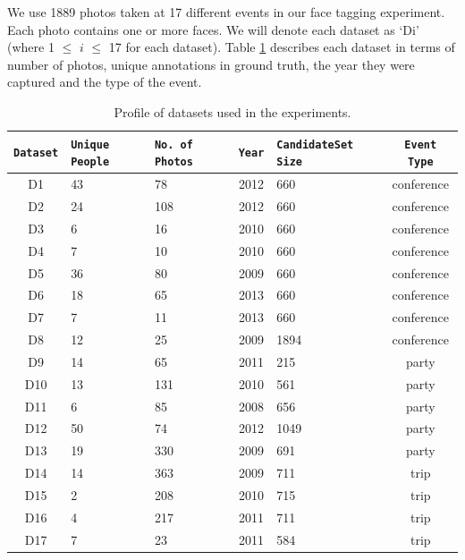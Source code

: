 We use 1889 photos taken at 17 different events in our face tagging experiment. Each photo contains one or more faces. We will denote each dataset as `Di' (where 1 $\leq$ $i$ $\leq$ 17 for each dataset). Table \ref{tbl:unique-persons} describes each dataset in terms of number of photos, unique annotations in ground truth, the year they were captured and the type of the event. 

\begin{table}[h]
\begin{center}
\begin{tabular}{ |c|p{1.5cm}|p{1.5cm}|c|p{2.5cm}|c| }
  \hline
  \texttt{Dataset} & \texttt{Unique People} & \texttt{No.\ of Photos} & \texttt{Year} & \texttt{CandidateSet Size} & \texttt{Event Type}\\
  \hline
     D1  &  43   &   78   &  2012  &  660   & conference \\
     D2  &  24   &   108  &  2012  &  660   & conference \\
     D3  &  6    &   16   &  2010  &  660   & conference \\
     D4  &  7    &   10   &  2010  &  660   & conference \\
     D5  &  36   &   80   &  2009  &  660   & conference \\
     D6  &  18   &   65   &  2013  &  660   & conference \\
     D7  &  7    &   11   &  2013  &  660   & conference \\
     D8  &  12   &   25   &  2009  &  1894  & conference \\
     D9  &  14   &   65   &  2011  &  215   & party \\
    D10  &  13   &   131  &  2010  &  561   & party \\
    D11  &  6    &   85   &  2008  &  656   & party \\
    D12  &  50   &   74   &  2012  &  1049  & party \\
    D13  &  19   &   330  &  2009  &  691   & party \\
    D14  &  14   &   363  &  2009  &  711   & trip \\
    D15  &  2    &   208  &  2010  &  715  & trip \\
    D16  &  4    &   217  &  2011  &  711  & trip \\
    D17  &  7    &   23   &  2011  &  584  & trip \\
  \hline
\end{tabular}
\caption{Profile of datasets used in the experiments.}
\label{tbl:unique-persons}
\end{center}
\end{table}

